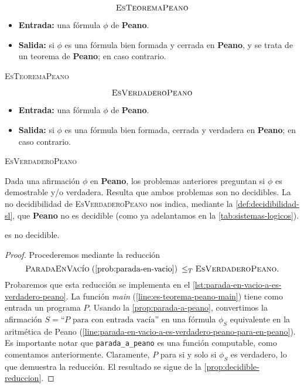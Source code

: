 \vspace{8pt}
\begin{problema}
\begin{framed}
$$\text{\textsc{EsTeoremaPeano}}$$

\begin{itemize}
    \item \textbf{Entrada:} una fórmula $\phi$ de \textbf{Peano}.
    \item \textbf{Salida:}  si $\phi$ es una fórmula bien formada y cerrada en \textbf{Peano}, y se trata de un teorema de \textbf{Peano};  en caso contrario.
\end{itemize}
\end{framed}
\caption{\textsc{EsTeoremaPeano}}
\label{prob:es-teorema-peano}
\end{problema}
\begin{problema}
\begin{framed}
$$\text{\textsc{EsVerdaderoPeano}}$$

\begin{itemize}
    \item \textbf{Entrada:} una fórmula $\phi$ de \textbf{Peano}.
    \item \textbf{Salida:}  si $\phi$ es una fórmula bien formada, cerrada y verdadera en \textbf{Peano};  en caso contrario.
\end{itemize}
\end{framed}
\caption{\textsc{EsVerdaderoPeano}}
\label{prob:es-verdadero-peano}
\end{problema}

Dada una afirmación $\phi$ en \textbf{Peano}, los problemas anteriores preguntan si $\phi$ es demostrable y/o verdadera. Resulta que ambos problemas son no decidibles. La no decidibilidad de \textsc{EsVerdaderoPeano} nos indica, mediante la \cref{def:decidibilidad-sl}, que \textbf{Peano} no es decidible (como ya adelantamos en la \cref{tab:sistemas-logicos}).

\begin{proposicion}\label{prop:es-verdadero-peano-no-decidible}
 es no decidible.
\end{proposicion}
\begin{proof}
Procederemos mediante la reducción
$$\textsc{ParadaEnVacío}\;\text{(\cref{prob:parada-en-vacio})} \:\leq_T \textsc{EsVerdaderoPeano}.$$
Probaremos que esta reducción se implementa en el \cref{lst:parada-en-vacio-a-es-verdadero-peano}. La función \emph{main} (\cref{line:es-teorema-peano-main}) tiene como entrada un programa $P$. Usando la \cref{prop:parada-a-peano}, convertimos la afirmación $S=\text{``$P$ para con entrada vacía''}$ en una fórmula $\phi_S$ equivalente en la aritmética de Peano (\cref{line:parada-en-vacio-a-es-verdadero-peano-para-en-peano}). Es importante notar que \texttt{parada\_a\_peano} es una función computable, como comentamos anteriormente. Claramente, $P$ para si y solo si $\phi_S$ es verdadero, lo que demuestra la reducción. El resultado se sigue de la \cref{prop:decidible-reduccion}.
\end{proof}

